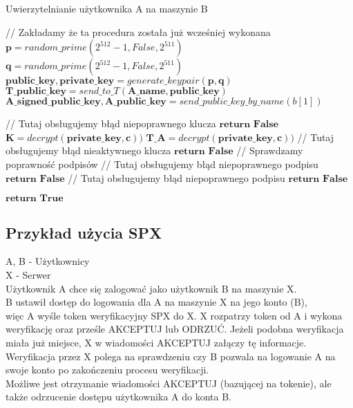 \documentclass[11pt]{article}
\begin{document}
\begin{algorithm}
	\caption{Uwierzytelnianie użytkownika A na maszynie B}
	\begin{algorithmic}[1]
    	    \State // Zakładamy że ta procedura została już wcześniej wykonana
    	    \State $\mathbf{p} = {random\_prime}(2^{512}-1,{False},2^{511})$
    	    \State $\mathbf{q} = {random\_prime}(2^{512}-1,{False},2^{511})$
    	    \State $\mathbf{public\_key, private\_key} = {generate\_keypair}(\mathbf{p}, \mathbf{q})$
    	    \State $\mathbf{T\_public\_key} = send\_to\_T(\mathbf{A\_name}, \mathbf{public\_key})$
        \EndProcedure
	        \State $\mathbf{A\_signed\_public\_key, A\_public\_key} = send\_public\_key\_by\_name(b[1])$
	        
    	        \State // Tutaj obsługujemy błąd niepoprawnego klucza
    	        \State  $\textbf{return False}$
    	    \EndIf
	        \State $\mathbf{K} = decrypt(\mathbf{private\_key}, \mathbf{c}))$
	        \State $\mathbf{T\_A} = decrypt(\mathbf{private\_key}, \mathbf{c}))$
    	        \State // Tutaj obsługujemy błąd nieaktywnego klucza
    	        \State  $\textbf{return False}$
    	    \EndIf
    	    \State // Sprawdzamy poprawność podpisów
    	        \State // Tutaj obsługujemy błąd niepoprawnego podpisu
    	        \State  $\textbf{return False}$
    	    \EndIf
    	        \State // Tutaj obsługujemy błąd niepoprawnego podpisu
    	        \State  $\textbf{return False}$
    	    \EndIf
    	    
    	    \State  $\textbf{return True}$
	    \EndProcedure
	\end{algorithmic} 
\end{algorithm}
\clearpage
\subsection{Przykład użycia SPX}
A, B - Użytkownicy\\
X - Serwer\\
Użytkownik A chce się zalogować jako użytkownik B na maszynie X.\\
B ustawił dostęp do logowania dla A na maszynie X na jego konto (B),\\
więc A wyśle token weryfikacyjny SPX do X. X rozpatrzy token od A i wykona weryfikację oraz prześle AKCEPTUJ lub ODRZUĆ. Jeżeli podobna weryfikacja miała już miejsce, X w wiadomości AKCEPTUJ załączy tę informacje.\\
Weryfikacja przez X polega na sprawdzeniu czy B pozwala na logowanie A na swoje konto po zakończeniu procesu weryfikacji.\\
Możliwe jest otrzymanie wiadomości AKCEPTUJ (bazującej na tokenie), ale także odrzucenie dostępu użytkownika A do konta B.\\
\end{document}
